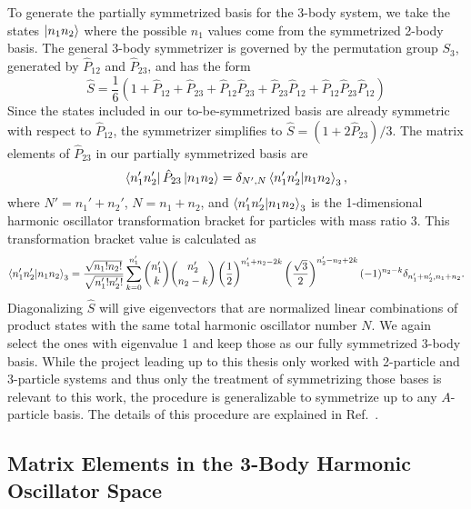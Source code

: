 To generate the partially symmetrized basis for the 3-body system, we take the states $\ket{n_1 n_2}$ where the possible $n_1$ values come from the symmetrized 2-body basis. The general 3-body symmetrizer is governed by the permutation group $S_3$, generated by $\hat{P}_{12}$ and $\hat{P}_{23}$, and has the form
\begin{equation}
\hat{S} = \frac{1}{6}(1 + \hat{P}_{12} + \hat{P}_{23} + \hat{P}_{12}\hat{P}_{23} + \hat{P}_{23}\hat{P}_{12} + \hat{P}_{12}\hat{P}_{23}\hat{P}_{12})
\end{equation}
Since the states included in our to-be-symmetrized basis are already symmetric with respect to $\hat{P}_{12}$, the symmetrizer simplifies to $\hat{S} = (1 + 2\hat{P}_{23})/3$. The matrix elements of $\hat{P}_{23}$ in our partially symmetrized basis are
\begin{equation}
\bra{n_1' n_2'}\hat{P}_{23}\ket{n_1 n_2} = \delta_{N',N} \bra{n_1' n_2'}\ket{n_1 n_2}_3,
\end{equation}
where $N'=n_1' +n_2'$, $N=n_1 + n_2$, and $\bra{n_1' n_2'}\ket{n_1 n_2}_3$ is the 1-dimensional harmonic oscillator transformation bracket for particles with mass ratio 3. This transformation bracket value is calculated as
\begin{equation}
\bra{n_1' n_2'}\ket{n_1 n_2}_3 =
\frac{\sqrt{n_1!n_2!}}{\sqrt{n_1'!n_2'!}}\sum_{k=0}^{n_1'}\binom{n_1'}{k}\binom{n_2'}{n_2
- k}\left(\frac{1}{2}\right)^{n_1' + n_2 -
2k}\left(\frac{\sqrt{3}}{2}\right)^{n_2' - n_2 + 2k} (-1)^{n_2-k}
\delta_{n_{1}' + n_{2}',n_{1} + n_{2}}.
\end{equation}
Diagonalizing $\hat{S}$ will give eigenvectors that are normalized linear combinations of product states with the same total harmonic oscillator number $N$. We again select the ones with eigenvalue 1 and keep those as our fully symmetrized 3-body basis. While the project leading up to this thesis only worked with 2-particle and 3-particle systems and thus only the treatment of symmetrizing those bases is relevant to this work, the procedure is generalizable to symmetrize up to any $A$-particle basis. The details of this procedure are explained in Ref.~\cite{Jurgenson:2008jp}.

\subsection{Matrix Elements in the 3-Body Harmonic Oscillator Space}

